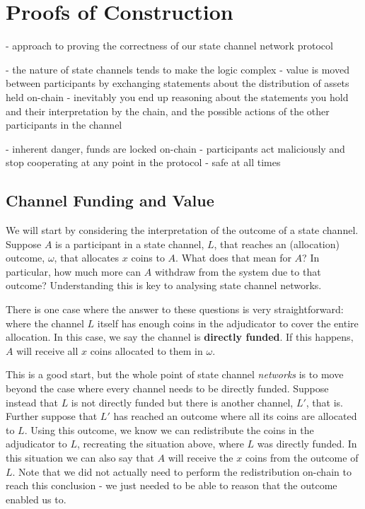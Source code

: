 \section{Proofs of Construction}\label{sec:reasoning}

- approach to proving the correctness of our state channel network protocol

- the nature of state channels tends to make the logic complex
- value is moved between participants by exchanging statements about the distribution of assets held on-chain
- inevitably you end up reasoning about the statements you hold and their interpretation by the chain, and the possible actions of the other participants in the channel

- inherent danger, funds are locked on-chain
- participants act maliciously and stop cooperating at any point in the protocol
- safe at all times

\subsection{Channel Funding and Value}

We will start by considering the interpretation of the outcome of a state channel.
Suppose $A$ is a participant in a state channel, $L$, that reaches an (allocation) outcome, $\omega$, that allocates $x$ coins to $A$.
What does that mean for $A$?
In particular, how much more can $A$ withdraw from the system due to that outcome?
Understanding this is key to analysing state channel networks.

\begin{figure}[h]\centering
  \makebox[\textwidth][c]{}
  \caption{
  }\label{fig:meaning-of-funding}
\end{figure}

There is one case where the answer to these questions is very straightforward:
where the channel $L$ itself has enough coins in the adjudicator to cover the entire allocation.
In this case, we say the channel is \textbf{directly funded}.
If this happens, $A$ will receive all $x$ coins allocated to them in $\omega$.
\begin{figure}[h]\centering
  \makebox[\textwidth][c]{}
  \caption{
  }\label{fig:direct-funding}
\end{figure}

This is a good start, but the whole point of state channel \textit{networks} is to move beyond the case where every channel needs to be directly funded.
Suppose instead that $L$ is not directly funded but there is another channel, $L'$, that is.
Further suppose that $L'$ has reached an outcome where all its coins are allocated to $L$.
Using this outcome, we know we can redistribute the coins in the adjudicator to $L$, recreating the situation above, where $L$ was directly funded.
In this situation we can also say that $A$ will receive the $x$ coins from the outcome of $L$.
Note that we did not actually need to perform the redistribution on-chain to reach this conclusion - we just needed to be able to reason that the outcome enabled us to.


